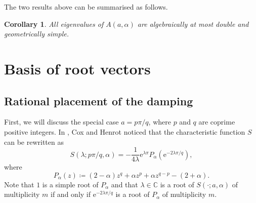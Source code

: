 \documentclass[11pt, a4paper,reqno]{amsart}
\theoremstyle{plain}
\newtheorem{corollary}[theorem]{Corollary}
\theoremstyle{definition}
\theoremstyle{remark}
\newcommand{\1}{\mathds 1}
\begin{document}
The two results above can be summarised as follows.

\begin{corollary}\label{C: Algebraic multiplicity}
All eigenvalues of $A(a, \alpha)$ are algebraically at most double and geometrically simple. 
\end{corollary}









\section{Basis of root vectors}\label{sec.Basis}

\subsection{Rational placement of the damping}
First, we will discuss the special case $a=p\pi/q$, where $p$ and $q$ are coprime positive integers. In \cite{CH}, Cox and Henrot noticed that the characteristic function $S$ can be rewritten as
\begin{equation}
S(\lambda; p\pi/q, \alpha) = -\frac{1}{4\lambda}\mathrm{e}^{\lambda\pi}P_\alpha(\mathrm{e}^{-2\lambda\pi/q}),
\label{SusingP}
\end{equation}
where
\begin{equation}
P_\alpha(z) \coloneqq (2-\alpha)z^q + \alpha z^p + \alpha z^{q-p} - (2+\alpha).
\label{Polynomial}
\end{equation}
Note that $1$ is a simple root of $P_\alpha$ and that $\lambda \in \mathbb C$ is a root of $S(\cdot; a, \alpha)$ of multiplicity $m$ if and only if $\mathrm{e}^{-2\lambda\pi/q}$ is a root of $P_\alpha$ of multiplicity $m$.
\end{document}
